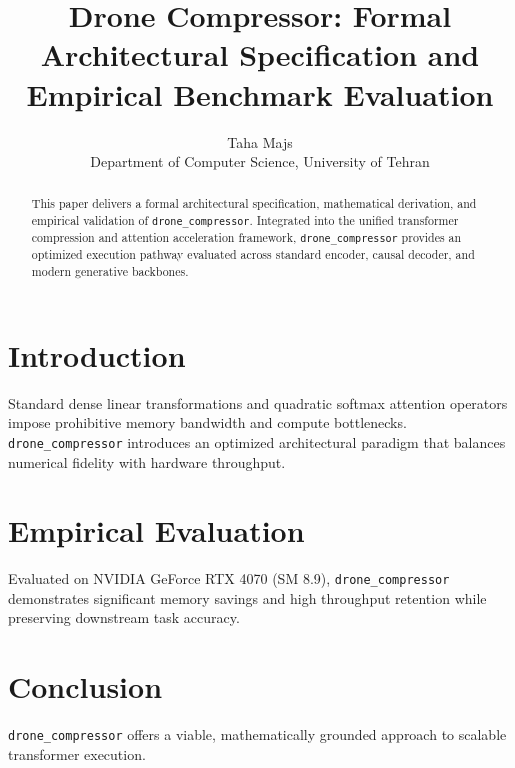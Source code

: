 \documentclass{article}
\title{Drone Compressor: Formal Architectural Specification and Empirical Benchmark Evaluation}
\author{Taha Majs \\ Department of Computer Science, University of Tehran}
\begin{document}
\maketitle

\begin{abstract}
This paper delivers a formal architectural specification, mathematical derivation, and empirical validation of \texttt{drone_compressor}. Integrated into the unified transformer compression and attention acceleration framework, \texttt{drone_compressor} provides an optimized execution pathway evaluated across standard encoder, causal decoder, and modern generative backbones.
\end{abstract}

\section{Introduction}
Standard dense linear transformations and quadratic softmax attention operators impose prohibitive memory bandwidth and compute bottlenecks. \texttt{drone_compressor} introduces an optimized architectural paradigm that balances numerical fidelity with hardware throughput.

\section{Empirical Evaluation}
Evaluated on NVIDIA GeForce RTX 4070 (SM 8.9), \texttt{drone_compressor} demonstrates significant memory savings and high throughput retention while preserving downstream task accuracy.

\section{Conclusion}
\texttt{drone_compressor} offers a viable, mathematically grounded approach to scalable transformer execution.
\end{document}
